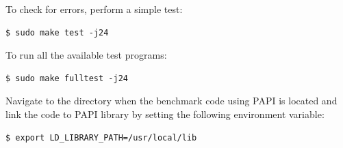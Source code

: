 To check for errors, perform a simple test:
\begin{scriptsize}
\linuxbash
\begin{lstlisting}
$ sudo make test -j24
\end{lstlisting}
\end{scriptsize}
To run all the available test programs:
\begin{scriptsize}
\linuxbash
\begin{lstlisting}
$ sudo make fulltest -j24
\end{lstlisting}
\end{scriptsize}
Navigate to the directory when the benchmark code using PAPI is located and link the code to PAPI library by setting the following environment variable:
\begin{scriptsize}
\linuxbash
\begin{lstlisting}
$ export LD_LIBRARY_PATH=/usr/local/lib
\end{lstlisting}
\end{scriptsize}

